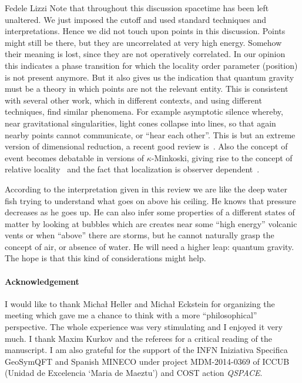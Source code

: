 \begin{artengenv}{Fedele Lizzi}
Note that throughout this discussion spacetime has been left unaltered. We just imposed the cutoff and used standard techniques and interpretations. Hence we did not touch upon points in this discussion.  Points might still be there, but they are uncorrelated at very high energy. Somehow their meaning is lost, since they are not operatively correlated. In our opinion this indicates a phase transition for which the locality order parameter (position) is not present anymore.
 But it also gives us the indication that quantum gravity must be a theory in which points are not the relevant entity.
This is consistent with several other work, which in different contexts, and using different techniques, find similar phenomena. For example asymptotic silence whereby, near gravitational singularities, light cones collapse into lines, so that again nearby points cannot communicate, or ``hear each other''.  This is but an extreme version of dimensional reduction, a recent good review is~\cite{Carlip}. Also the concept of event becomes debatable in versions of $\kappa$-Minkoski, giving rise to the concept of relative locality~\cite{relaloc} and the fact that localization is observer dependent~\cite{LMM}.





According to the interpretation given in this review we are like the deep water fish trying to understand what goes on above his ceiling.
He knows that pressure decreases as he goes up. He can also infer some properties of a different states of matter by looking at bubbles which are creates near some ``high energy'' volcanic vents or when ``above'' there are storms, but he cannot naturally grasp the concept of air, or absence of water.
He will need a higher leap: quantum gravity. The hope is that this kind of considerations might help.

\paragraph{Acknowledgement}
I would like to thank Micha\l{} Heller and Micha\l{} Eckstein for organizing the meeting which gave me a chance to think with a more ``philosophical'' perspective. The whole experience was very stimulating and I enjoyed it very much. I thank Maxim Kurkov and the referees for a critical reading of the manuscript.
I am also grateful for the support of the INFN Iniziativa Specifica GeoSymQFT and Spanish
MINECO under project MDM-2014-0369 of ICCUB (Unidad de Excelencia `Maria de Maeztu') and  COST action \emph{QSPACE}.



\end{artengenv}
